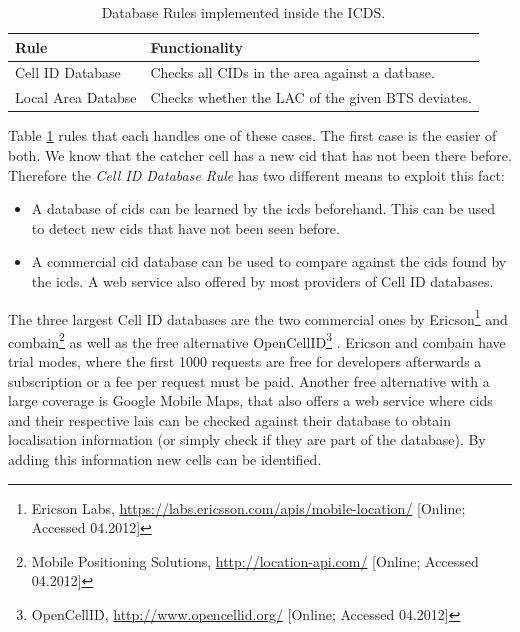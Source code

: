\begin{table}
\centering
\begin{tabular}{ll}
\toprule
Rule					&Functionality\\
\midrule
Cell ID Database		&Checks all CIDs in the area against a datbase.\\
Local Area Databse 		&Checks whether the LAC of the given BTS deviates.\\
\bottomrule
\end{tabular}
\caption{Database Rules implemented inside the ICDS.}
\label{tab:database_rules}
\end{table}

Table \ref{tab:database_rules} rules that each handles one of these cases.
The first case is the easier of both.
We know that the catcher cell has a new \gls{cid} that has not been there before.
Therefore the \emph{Cell ID Database Rule} has two different means to exploit this fact:
\begin{itemize}
	\item A database of \glspl{cid} can be learned by the \gls{icds} beforehand. 
	This can be used to detect new \glspl{cid} that have not been seen before.
	\item A commercial \gls{cid} database can be used to compare against the \glspl{cid} found by the \gls{icds}.
	A web service also offered by most providers of Cell ID databases.
\end{itemize}
The three largest Cell ID databases are the two commercial ones by Ericson\footnote{Ericson Labs, \url{https://labs.ericsson.com/apis/mobile-location/} [Online; Accessed 04.2012]} and combain\footnote{Mobile Positioning Solutions, \url{http://location-api.com/} [Online; Accessed 04.2012]} as well as the free alternative OpenCellID\footnote{OpenCellID, \url{http://www.opencellid.org/} [Online; Accessed 04.2012]} \cite{wiki_cells}.
Ericson and combain have trial modes, where the first 1000 requests are free for developers afterwards a subscription or a fee per request must be paid.
Another free alternative with a large coverage is Google Mobile Maps, that also offers a web service where \glspl{cid} and their respective \glspl{lai} can be checked against their database to obtain localisation information (or simply check if they are part of the database).
By adding this information new cells can be identified.

